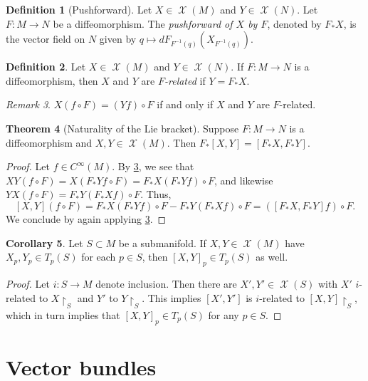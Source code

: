 \documentclass[10pt,letterpaper,cm]{nupset}
\theoremstyle{definition}
\newtheorem{definition}{Definition}[subsection]
\theoremstyle{theorem}
\newtheorem{theorem}[definition]{Theorem}
\newtheorem{corollary}[definition]{Corollary}
\theoremstyle{remark}
\newtheorem{remark}[definition]{Remark}
\newcommand{\1}{\mathbf{1}}
\newcommand{\0}{\vec 0}
\DeclareMathOperator{\vf}{\mathscr{X}}
\begin{document}
\begin{definition}[Pushforward]
Let $X \in \vf(M)$ and $Y \in \vf(N)$. Let $F: M \to N$ be a diffeomorphism. The \textit{pushforward of $X$ by $F$}, denoted by $F_{\ast}X$, is the vector field on $N$ given by $q \mapsto dF_{F^{-1}(q)}\left(X_{F^{-1}(q)}\right)$.
\end{definition}

\begin{definition}
Let $X \in \vf(M)$ and $Y \in \vf(N)$. If $F: M \to N$ is a diffeomorphism, then $X$ and $Y$ are \textit{$F$-related} if $Y = F_{\ast}X$.
\end{definition}

\begin{remark}\label{relat}
$X(f \circ F) = (Yf) \circ F$ if and only if $X$ and $Y$ are $F$-related.
\end{remark}

\begin{theorem}[Naturality of the Lie bracket]
Suppose $F: M \to N$ is a diffeomorphism and $X, Y \in \vf(M)$. Then $F_{\ast}[X, Y] = [F_{\ast}X, F_{\ast}Y]$.
\end{theorem}
\begin{proof}
Let $ f\in C^{\infty}(M)$. By \cref{relat}, we see that $XY(f \circ F) = X(F_{\ast}Yf \circ F) = F_{\ast}X(F_{\ast}Yf) \circ F$, and likewise $YX(f \circ F) = F_{\ast}Y(F_{\ast}X f) \circ F$. Thus, $$[X, Y](f \circ F) = F_{\ast}X(F_{\ast}Yf) \circ F - F_{\ast}Y(F_{\ast}X f) \circ F = \left([F_{\ast}X, F_{\ast}Y] f\right) \circ F.$$ We conclude by again applying \cref{relat}.
\end{proof}

\begin{corollary}
Let $S \subset M$ be a submanifold. If $X, Y \in \vf(M)$ have $X_p, Y_p \in T_p(S)$ for each $p\in S$, then $[X, Y]_p \in T_p(S)$ as well.
\end{corollary}
\begin{proof}
Let $i : S \to M$ denote inclusion. Then  there are $X', Y' \in \vf(S)$ with $X'$ $i$-related to $X\restriction_S$ and $Y'$ to $Y\restriction_S$. This implies $[X', Y']$ is $i$-related to $\left[X, Y\right]\restriction_S$, which in turn implies that $\left[X, Y\right]_p \in T_p(S)$ for any $p\in S$.  
\end{proof}

\section{Vector bundles}
\end{document}
